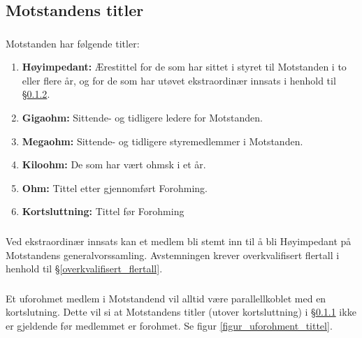 \documentclass{article}
\newenvironment{statute}[1][]
    {
        \titleformat{\subsubsection}[runin]{\normalfont}{\hspace{1pt}\textit{\S\hspace{5pt}\thesubsubsection}}{0pt}{\rule{4pt}{0pt}}{}
        \subsubsection{}#1
        \begin{minipage}[t]{0.89\linewidth}
    }
    {
        \end{minipage}
        
        \ignorespacesafterend
    }
\begin{document}
        \subsection{Motstandens titler}
            \begin{statute}[\label{motstandens_titler}]
                Motstanden har følgende titler:
                \begin{enumerate}[font = \bfseries]
                    \item \textbf{Høyimpedant:} Ærestittel for de som har sittet i styret til Motstanden i to eller flere år, og for de som har utøvet ekstraordinær innsats i henhold til \S\hspace{3pt}\ref{stemt_til_høyimpedant}.
                    \item \textbf{Gigaohm:} Sittende- og tidligere ledere for Motstanden.
                    \item \textbf{Megaohm:} Sittende- og tidligere styremedlemmer i Motstanden.
                    \item \textbf{Kiloohm:} De som har vært ohmsk i et år.
                    \item \textbf{Ohm:} Tittel etter gjennomført Forohming.
                    \item \textbf{Kortsluttning:} Tittel før Forohming
                \end{enumerate}
            \end{statute}
            \begin{statute}[\label{stemt_til_høyimpedant}]
            	Ved ekstraordinær innsats kan et medlem bli stemt inn til å bli Høyimpedant på Motstandens generalvorssamling. Avstemningen krever overkvalifisert flertall i henhold til \S\hspace{3pt}\ref{overkvalifisert_flertall}.
            \end{statute}
        	\begin{statute}[\label{statutt_uforohmet_tittel}]
        		Et uforohmet medlem i Motstandend vil alltid være parallellkoblet med en kortslutning. Dette vil si at Motstandens titler (utover kortsluttning) i \S\hspace{3pt}\ref{motstandens_titler} ikke er gjeldende før medlemmet er forohmet. Se figur \ref{figur_uforohment_tittel}.
        	\end{statute}
        
\end{document}
